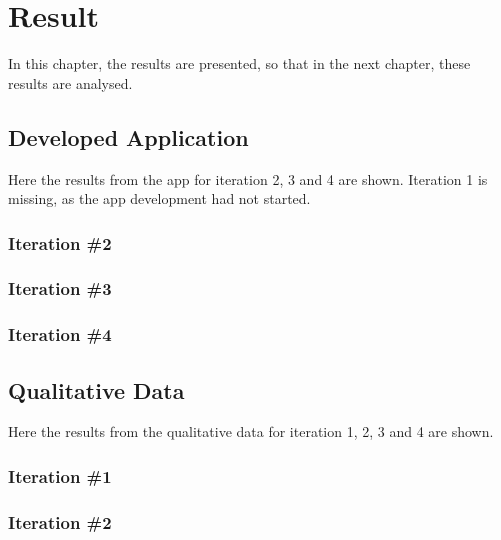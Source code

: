 \chapter{Result}\label{cha:Research}
%


In this chapter, the results are presented, so that in the next chapter, these results are analysed.

%

\section{Developed Application}

Here the results from the app for iteration 2, 3 and 4 are shown. Iteration 1 is missing, as the app development had not started.

\subsection{Iteration \#2}


\subsection{Iteration \#3}


\subsection{Iteration \#4}



\section{Qualitative Data}

Here the results from the qualitative data for iteration 1, 2, 3 and 4 are shown.

\subsection{Iteration \#1}


\subsection{Iteration \#2}

